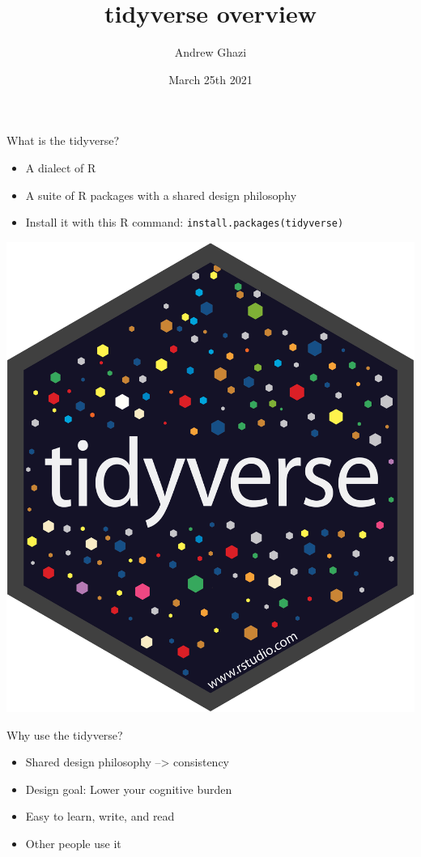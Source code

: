 \documentclass[
  ignorenonframetext,
]{beamer}
\title{tidyverse overview}
\author{Andrew Ghazi}
\date{March 25th 2021}
\providecommand{\tightlist}{%
  \setlength{\itemsep}{0pt}\setlength{\parskip}{0pt}}
\begin{document}
\frame{\titlepage}

\begin{frame}[fragile]{What is the tidyverse?}
\protect\hypertarget{what-is-the-tidyverse}{}
\begin{itemize}
\item
  A dialect of R
\item
  A suite of R packages with a shared design philosophy
\item
  Install it with this R command:
  \texttt{install.packages(\textquotesingle{}tidyverse\textquotesingle{})}
\end{itemize}

\includegraphics[width=0.95\linewidth,height=0.95\textheight]{images/tidyverse-logo}
\end{frame}

\begin{frame}{Why use the tidyverse?}
\protect\hypertarget{why-use-the-tidyverse}{}
\begin{itemize}
\tightlist
\item
  Shared design philosophy --\textgreater{} consistency
\item
  Design goal: Lower your cognitive burden
\item
  Easy to learn, write, and read
\item
  Other people use it
\end{itemize}
\end{frame}
\end{document}
